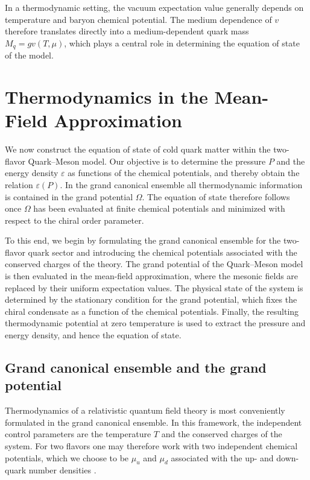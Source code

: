 In a thermodynamic setting, the vacuum expectation value generally
depends on temperature and baryon chemical potential. The medium
dependence of $v$ therefore translates directly into a medium-dependent
quark mass $M_q = g v(T,\mu)$, which plays a central role in determining
the equation of state of the model.

\section{Thermodynamics in the Mean-Field Approximation}

We now construct the equation of state of cold quark matter within the
two-flavor Quark--Meson model. Our objective is to determine the
pressure $P$ and the energy density $\varepsilon$ as functions of the
chemical potentials, and thereby obtain the relation
$\varepsilon(P)$. In the grand canonical ensemble all thermodynamic
information is contained in the grand potential $\Omega$.
The equation of state therefore follows once $\Omega$ has been
evaluated at finite chemical potentials and minimized with respect to
the chiral order parameter.

To this end, we begin by formulating the grand canonical ensemble for
the two-flavor quark sector and introducing the chemical potentials
associated with the conserved charges of the theory. The grand
potential of the Quark--Meson model is then evaluated in the
mean-field approximation, where the mesonic fields are replaced by
their uniform expectation values. The physical state of the system is
determined by the stationary condition for the grand potential, which
fixes the chiral condensate as a function of the chemical potentials.
Finally, the resulting thermodynamic potential at zero temperature is
used to extract the pressure and energy density, and hence the
equation of state.

\subsection*{Grand canonical ensemble and the grand potential}

Thermodynamics of a relativistic quantum field theory is most
conveniently formulated in the grand canonical ensemble.
In this framework, the independent control parameters are the
temperature $T$ and the conserved charges of the system.
For two flavors one may therefore work with two independent chemical
potentials, which we choose to be $\mu_u$ and $\mu_d$ associated with
the up- and down-quark number densities \cite{KapustaGale,LaineVuorinen}.

